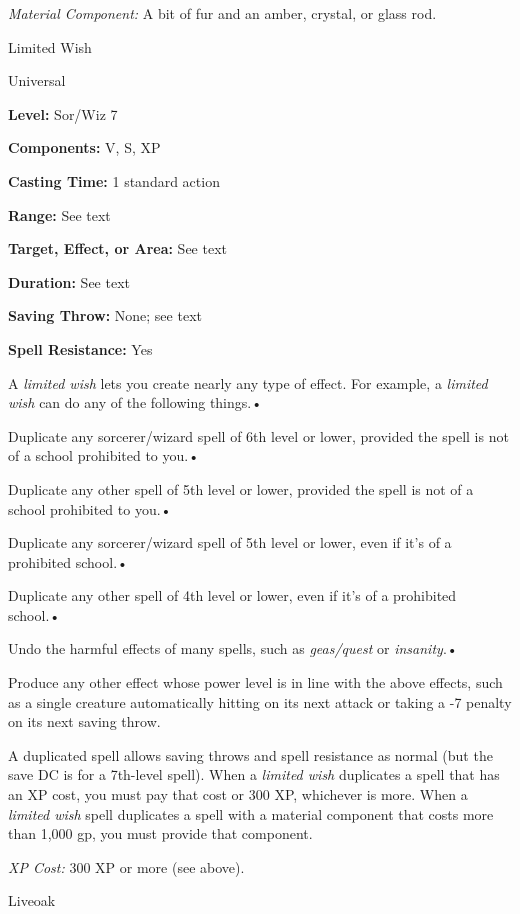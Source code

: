 \documentclass{article}
\begin{document}
\textit{Material Component: }A bit of fur and an amber, crystal, or glass rod.

\vspace{12pt}
Limited Wish

Universal

\textbf{Level:} Sor/Wiz 7

\textbf{Components:} V, S, XP

\textbf{Casting Time:} 1 standard action

\textbf{Range:} See text

\textbf{Target, Effect, or Area:} See text

\textbf{Duration:} See text

\textbf{Saving Throw:} None; see text

\textbf{Spell Resistance:} Yes

A \textit{limited wish }lets you create nearly any type of effect. For example, 
a \textit{limited wish }can do any of the following things.• 

Duplicate any sorcerer/wizard spell of 6th level or lower, provided the spell is 
not of a school prohibited to you.• 

Duplicate any other spell of 5th level or lower, provided the spell is not of a 
school prohibited to you.• 

Duplicate any sorcerer/wizard spell of 5th level or lower, even if it's of a prohibited 
school.• 

Duplicate any other spell of 4th level or lower, even if it's of a prohibited school.• 

Undo the harmful effects of many spells, such as \textit{geas/quest }or \textit{insanity}.• 

Produce any other effect whose power level is in line with the above effects, such 
as a single creature automatically hitting on its next attack or taking a -7 penalty 
on its next saving throw.

A duplicated spell allows saving throws and spell resistance as normal (but the 
save DC is for a 7th-level spell). When a \textit{limited wish }duplicates a spell 
that has an XP cost, you must pay that cost or 300 XP, whichever is more. When 
a \textit{limited wish }spell duplicates a spell with a material component that 
costs more than 1,000 gp, you must provide that component.

\textit{XP Cost: }300 XP or more (see above).

\vspace{12pt}
Liveoak
\end{document}
